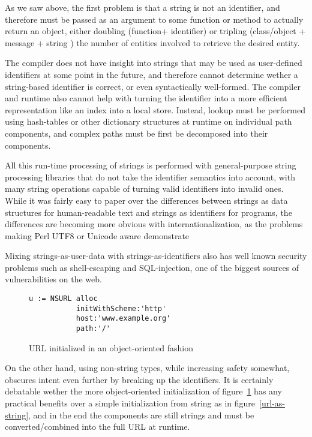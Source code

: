 \documentclass[preprint,authoryear]{acm_proc_article-sp}
\begin{document}
As we saw above, the first problem is that a string is not an identifier, and therefore
must be passed as an argument to some function or method to actually return
 an object, either doubling (function+
identifier) or tripling (class/object + message + string ) the number of entities involved to 
retrieve the desired entity.  

The compiler does not have insight into strings that may be used as user-defined 
identifiers at some point in the future, and therefore cannot determine wether 
a string-based identifier is correct, or even syntactically well-formed.   The compiler
and runtime also cannot help with turning the identifier into a more efficient representation
like an index into a local store.  Instead, lookup must be performed using hash-tables
or other dictionary structures at runtime on individual path components, 
and complex paths must be first be decomposed into their components.

All this run-time processing of strings is performed with general-purpose string
processing libraries that do not take the identifier semantics into account, with
many string operations capable of turning valid identifiers into invalid ones.
While it was fairly easy to paper over the differences between strings as 
data structures for human-readable text and strings as identifiers for programs,
the differences are becoming more obvious with internationalization, as the
problems making Perl UTF8 or Unicode aware demonstrate \cite{perl-unicode}

Mixing strings-as-user-data with strings-as-identifiers also has well known
security problems such as shell-escaping and SQL-injection, one of the
biggest sources of vulnerabilities on the web.



\begin{figure}[htbp]
\begin{center}
\begin{small}
\begin{verbatim}
u := NSURL alloc
           initWithScheme:'http'
           host:'www.example.org'
           path:'/' 
\end{verbatim}
\end{small}
\caption{URL initialized in an object-oriented fashion}
\label{url-as-obj}
\end{center}
\end{figure}

On the other hand, using non-string types, while increasing safety somewhat,
obscures intent even further by breaking up the identifiers.
It is certainly debatable wether the more object-oriented
initialization of figure~\ref{url-as-obj}  has any practical benefits over a
simple initialization from string as in figure~\ref{url-as-string}, and in
the end the components are still strings and must be converted/combined
into the full URL at runtime.
\end{document}
